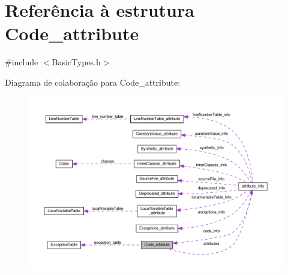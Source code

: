 \hypertarget{structCode__attribute}{}\section{Referência à estrutura Code\+\_\+attribute}
\label{structCode__attribute}


{\ttfamily \#include $<$Basic\+Types.\+h$>$}



Diagrama de colaboração para Code\+\_\+attribute\+:
\nopagebreak
\begin{figure}[H]
\begin{center}
\leavevmode
\includegraphics[width=350pt]{structCode__attribute__coll__graph}
\end{center}
\end{figure}
